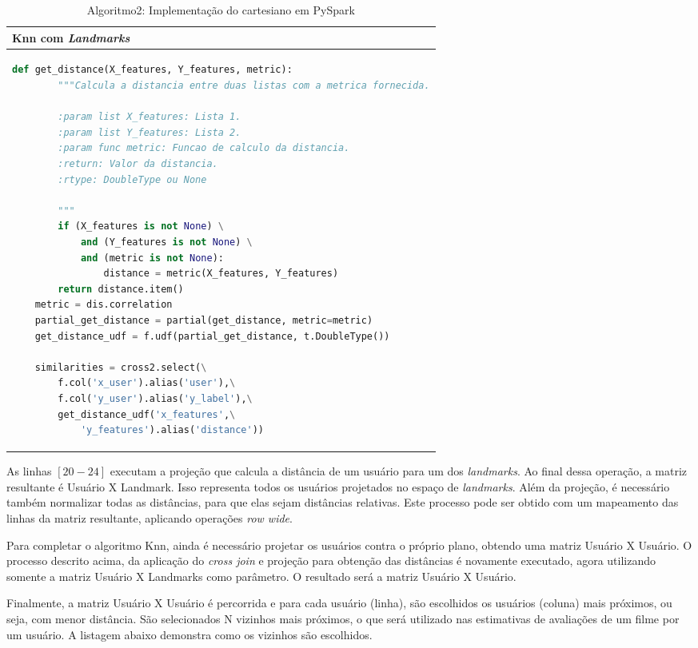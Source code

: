 \documentclass[12pt]{article}
\begin{document}
\begin{table}[ht]
	\begin{tabular}{l}
		Knn com \textit{Landmarks} \\ \hline
\begin{lstlisting}[language=Python]
	def get_distance(X_features, Y_features, metric):
		"""Calcula a distancia entre duas listas com a metrica fornecida.
		
		:param list X_features: Lista 1.
		:param list Y_features: Lista 2.
		:param func metric: Funcao de calculo da distancia.
		:return: Valor da distancia.
		:rtype: DoubleType ou None
		
		"""
		if (X_features is not None) \
			and (Y_features is not None) \
			and (metric is not None):
				distance = metric(X_features, Y_features)
		return distance.item()
	metric = dis.correlation
	partial_get_distance = partial(get_distance, metric=metric)
	get_distance_udf = f.udf(partial_get_distance, t.DoubleType())
	
	similarities = cross2.select(\
		f.col('x_user').alias('user'),\
		f.col('y_user').alias('y_label'),\
		get_distance_udf('x_features',\
			'y_features').alias('distance'))
\end{lstlisting}	
	\end{tabular}
	\caption{Algoritmo2: Implementação do cartesiano em PySpark}
	\label{tab:code1}
\end{table}

As linhas $[20-24]$ executam a projeção que calcula a distância de um usuário para um dos \textit{landmarks}. Ao final dessa operação, a matriz resultante é Usuário X Landmark. Isso representa todos os usuários projetados no espaço de \textit{landmarks}. Além da projeção, é necessário também normalizar todas as distâncias, para que elas sejam distâncias relativas. Este processo pode ser obtido com um mapeamento das linhas da matriz resultante, aplicando operações \textit{row wide}.

Para completar o algoritmo Knn, ainda é necessário projetar os usuários contra o próprio plano, obtendo uma matriz Usuário X Usuário. O processo descrito acima, da aplicação do \textit{cross join} e projeção para obtenção das distâncias é novamente executado, agora utilizando somente a matriz Usuário X Landmarks como parâmetro. O resultado será a matriz Usuário X Usuário.

Finalmente, a matriz Usuário X Usuário é percorrida e para cada usuário (linha), são escolhidos os usuários (coluna) mais próximos, ou seja, com menor distância. São selecionados N vizinhos mais próximos, o que será utilizado nas estimativas de avaliações de um filme por um usuário. A listagem abaixo demonstra como os vizinhos são escolhidos.
\end{document}
